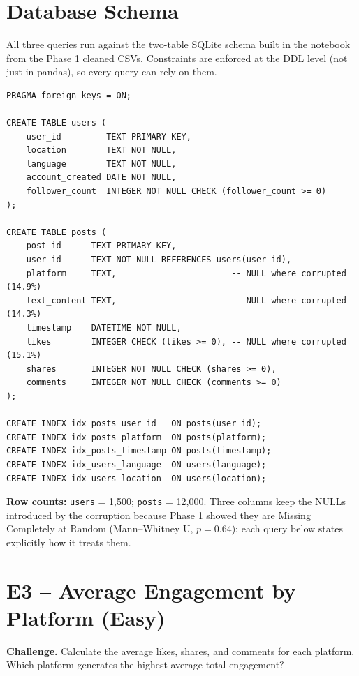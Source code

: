 \documentclass[11pt,a4paper]{article}
\begin{document}
\color{bodytext}

\section{Database Schema}

All three queries run against the two-table SQLite schema built in the notebook from the Phase 1 cleaned CSVs. Constraints are enforced at the DDL level (not just in pandas), so every query can rely on them.

\begin{lstlisting}
PRAGMA foreign_keys = ON;

CREATE TABLE users (
    user_id         TEXT PRIMARY KEY,
    location        TEXT NOT NULL,
    language        TEXT NOT NULL,
    account_created DATE NOT NULL,
    follower_count  INTEGER NOT NULL CHECK (follower_count >= 0)
);

CREATE TABLE posts (
    post_id      TEXT PRIMARY KEY,
    user_id      TEXT NOT NULL REFERENCES users(user_id),
    platform     TEXT,                       -- NULL where corrupted (14.9%)
    text_content TEXT,                       -- NULL where corrupted (14.3%)
    timestamp    DATETIME NOT NULL,
    likes        INTEGER CHECK (likes >= 0), -- NULL where corrupted (15.1%)
    shares       INTEGER NOT NULL CHECK (shares >= 0),
    comments     INTEGER NOT NULL CHECK (comments >= 0)
);

CREATE INDEX idx_posts_user_id   ON posts(user_id);
CREATE INDEX idx_posts_platform  ON posts(platform);
CREATE INDEX idx_posts_timestamp ON posts(timestamp);
CREATE INDEX idx_users_language  ON users(language);
CREATE INDEX idx_users_location  ON users(location);
\end{lstlisting}

\textbf{Row counts:} \texttt{users} = 1,500; \texttt{posts} = 12,000. Three columns keep the NULLs introduced by the corruption because Phase 1 showed they are Missing Completely at Random (Mann--Whitney U, $p = 0.64$); each query below states explicitly how it treats them.

\section{E3 -- Average Engagement by Platform (Easy)}

\textbf{Challenge.} Calculate the average likes, shares, and comments for each platform. Which platform generates the highest average total engagement?
\end{document}
